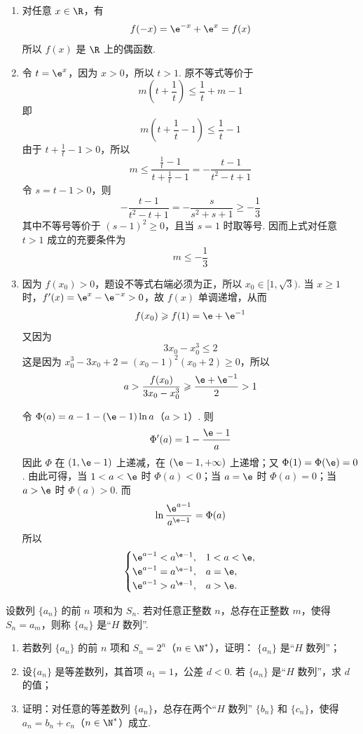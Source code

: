 \begin{solution}
\begin{enumerate}
\item 对任意 \(x\in\R\)，有
\[
f(-x)=\e^{-x}+\e^x=f(x)
\]
所以 \(f(x)\) 是 \(\R\) 上的偶函数.

\item 令 \(t=\e^x\)，因为 \(x>0\)，所以 \(t>1\). 原不等式等价于
\[
m\left(t+\frac1t\right)\leqslant\frac1t+m-1
\]
即
\[
m\left(t+\frac1t-1\right)\leqslant\frac1t-1
\]
由于 \(t+\frac1t-1>0\)，所以
\[
m\leqslant\frac{\frac1t-1}{t+\frac1t-1}=-\frac{t-1}{t^2-t+1}
\]
令 \(s=t-1>0\)，则
\[
-\frac{t-1}{t^2-t+1}=-\frac{s}{s^2+s+1}\geqslant-\frac13
\]
其中不等号等价于 \((s-1)^2\geqslant0\)，且当 \(s=1\) 时取等号. 因而上式对任意 \(t>1\) 成立的充要条件为
\[
m\leqslant-\frac13
\]

\item 因为 \(f(x_0)>0\)，题设不等式右端必须为正，所以 \(x_0\in[1,\sqrt3)\). 当 \(x\geqslant1\) 时，\(f'(x)=\e^x-\e^{-x}>0\)，故 \(f(x)\) 单调递增，从而
\[
f(x_0)\geqslant f(1)=\e+\e^{-1}
\]
又因为
\[
3x_0-x_0^3\leqslant2
\]
这是因为 \(x_0^3-3x_0+2=(x_0-1)^2(x_0+2)\geqslant0\)，所以
\[
a>\frac{f(x_0)}{3x_0-x_0^3}\geqslant\frac{\e+\e^{-1}}2>1
\]

令 \(\Phi(a)=a-1-(\e-1)\ln a\)（\(a>1\)）.
则
\[
\Phi'(a)=1-\frac{\e-1}{a}
\]
因此 \(\Phi\) 在 \((1,\e-1)\) 上递减，在 \((\e-1,+\infty)\) 上递增；又 \(\Phi(1)=\Phi(\e)=0\). 由此可得，当 \(1<a<\e\) 时 \(\Phi(a)<0\)；当 \(a=\e\) 时 \(\Phi(a)=0\)；当 \(a>\e\) 时 \(\Phi(a)>0\).
而
\[
\ln\frac{\e^{a-1}}{a^{\e-1}}=\Phi(a)
\]
所以
\[
\begin{cases}
\e^{a-1}<a^{\e-1},&1<a<\e,\\
\e^{a-1}=a^{\e-1},&a=\e,\\
\e^{a-1}>a^{\e-1},&a>\e.
\end{cases}
\]
\end{enumerate}
\end{solution}

\begin{problem}
设数列 \(\{a_{n}\}\) 的前 \(n\) 项和为 \(S_{n}\). 若对任意正整数 \(n\)，总存在正整数 \(m\)，使得 \(S_{n} = a_{m}\)，则称 \(\{a_{n}\}\) 是“\(H\) 数列”.
\begin{enumerate}
\item 若数列 \( \{a_{n}\} \) 的前 \(n\) 项和 \( S_{n}=2^{n} \)（\(n\in \N^{*}\)），证明： \( \{a_{n}\} \) 是“\(H\) 数列”；
\item 设\(\{a_{n}\}\) 是等差数列，其首项 \(a_{1} = 1\)，公差 \(d < 0\). 若 \(\{a_{n}\}\) 是“\(H\) 数列”，求 \(d\) 的值；
\item 证明：对任意的等差数列 \(\{a_{n}\}\)，总存在两个“\(H\) 数列” \(\{b_{n}\} \) 和 \(\{c_{n}\}\)，使得 \(a_{n} = b_{n} + c_{n}\)（\(n \in \N^{*}\)）成立.
\end{enumerate}
\end{problem}

